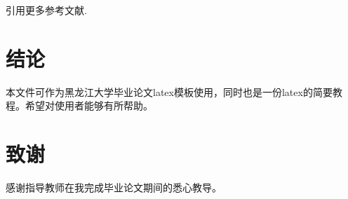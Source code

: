 \documentclass[UTF8]{ctexart}
\begin{document}
引用更多参考文献\cite{XJAZ243D228EAB76061B96C07507F171A5C8,SJPDAC8FDAF91C03ADB36A20138EEB8A381F,JYRJ202212005,ACZJ201302092,BJXB201303037,GZDN201104031,1012028643.nh,JYKQ201801007,JYKQ201206034,KJCB201009091,JYRJ201205063,SJPDAC8FDAF91C03ADB36A20138EEB8A381F,UGGA201208001025,BJXB201303037,ACZJ201302092,SJPDAC8FDAF91C03ADB36A20138EEB8A381F,KJXX201011361,JYRJ202212005,HLKX202323022}.
\newpage
\section*{结论}
本文件可作为黑龙江大学毕业论文latex模板使用，同时也是一份latex的简要教程。希望对使用者能够有所帮助。
\newpage
{}
\printbibliography

\newpage
\section*{致谢}
感谢指导教师在我完成毕业论文期间的悉心教导。
\end{document}
